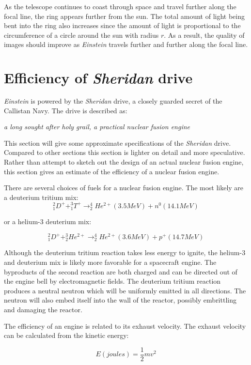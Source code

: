 \documentclass[12pt]{article} %
\begin{document}
As the telescope continues to coast through space and travel further along the focal line, the  ring appears further from the sun. The total amount of light being bent into the ring also increases since the amount of light is proportional to the circumference of a circle around the sun with radius $r$. As a result, the quality of images should improve as \textit{Einstein} travels further and further along the focal line.

\newpage
\section{Efficiency of \textit{Sheridan} drive}
\label{sec:efficiency}
\textit{Einstein} is powered by the \textit{Sheridan} drive, a closely guarded secret of the Callistan Navy. The drive is described as:

\hspace{2cm} \textit{a long sought after holy grail, a practical nuclear fusion engine}

This section will give some approximate specifications of the \textit{Sheridan} drive. Compared to other sections this section is lighter on detail and more speculative. Rather than attempt to sketch out the design of an actual nuclear fusion engine, this section gives an estimate of the efficiency of a nuclear fusion engine.

There are several choices of fuels for a nuclear fusion engine. The most likely are a deuterium tritium mix:
$$^2_1D^+ + ^3_1T^+ \rightarrow ^4_2He^{2+} (3.5 MeV) + n^0 (14.1 MeV)$$

or a helium-3 deuterium mix:

$$^2_1D^+ + ^3_2He^{2+} \rightarrow ^4_2He^{2+} (3.6 MeV) + p^+ (14.7 MeV)$$

Although the deuterium tritium reaction takes less energy to ignite, the helium-3 and deuterium mix is likely more favorable for a spacecraft engine. The byproducts of the second reaction are both charged and can be directed out of the engine bell by electromagnetic fields. The deuterium tritium reaction produces a neutral neutron which will be uniformly emitted in all directions. The neutron will also embed itself into the wall of the reactor, possibly embrittling and damaging the reactor.

The efficiency of an engine is related to its exhaust velocity. The exhaust velocity can be calculated from the kinetic energy:

$$E (joules) = \frac{1}{2}mv^2$$
\end{document}
